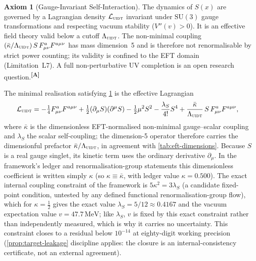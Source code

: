 \documentclass[12pt,a4paper,twoside]{article}
\theoremstyle{plain}
\theoremstyle{definition}
\newtheorem{axiom}{Axiom}
\theoremstyle{remark}
\newcommand{\UIDT}{\textsc{uidt}}
\newcommand{\MeV}{\,\mathrm{MeV}}
\newcommand{\catmark}[1]{\textsuperscript{\textsf{\textbf{[#1]}}}}
\newcommand{\Sx}{S(x)}
\newcommand{\lambdaS}{5/12 \approx 0.4167} %
\newcommand{\kappaVal}{0.500} %
\newcommand{\vVEV}{47.7\MeV} %
\begin{document}
\begin{axiom}[Gauge-Invariant Self-Interaction]
\label{ax:gauge}
The dynamics of $\Sx$ are governed by a Lagrangian density $\mathcal{L}_{\UIDT}$ invariant under $\mathrm{SU}(3)$ gauge transformations and respecting vacuum stability ($V''(v)>0$). It is an effective field theory valid below a cutoff $\Lambda_{\UIDT}$. The non-minimal coupling $(\bar\kappa/\Lambda_{\UIDT})\,S\,F_{\mu\nu}^a F^{a\mu\nu}$ has mass dimension~5 and is therefore not renormalisable by strict power counting; its validity is confined to the EFT domain (Limitation~L7). A full non-perturbative UV completion is an open research question.\catmark{A}
\end{axiom}

\noindent The minimal realisation satisfying \cref{ax:gauge} is the effective Lagrangian
\begin{equation}
 \mathcal{L}_{\UIDT}
 = -\tfrac{1}{4}F_{\mu\nu}^a F^{a\mu\nu}
 + \tfrac{1}{2}(\partial_\mu S)(\partial^\mu S)
 - \tfrac{1}{2}\mu^2 S^2
 - \frac{\lambda_S}{4!}S^4
 + \frac{\bar\kappa}{\Lambda_{\UIDT}}\,S\,F_{\mu\nu}^a F^{a\mu\nu},
 \label{eq:lagrangian}
\end{equation}
where $\bar\kappa$ is the dimensionless EFT-normalised non-minimal gauge--scalar coupling and $\lambda_S$ the scalar self-coupling; the dimension-5 operator therefore carries the dimensionful prefactor $\bar\kappa/\Lambda_{\UIDT}$, in agreement with \cref{tab:eft-dimensions}. Because $S$ is a real gauge singlet, its kinetic term uses the ordinary derivative $\partial_\mu$. In the framework's ledger and renormalisation-group statements this dimensionless coefficient is written simply $\kappa$ (so $\kappa\equiv\bar\kappa$, with ledger value $\kappa=\kappaVal$). The exact internal coupling constraint of the framework is $5\kappa^2 = 3\lambda_S$ (a candidate fixed-point condition, untested by any defined functional renormalisation-group flow), which for $\kappa = \tfrac{1}{2}$ gives the exact value $\lambda_S = \lambdaS$ and the vacuum expectation value $v = \vVEV$; like $\lambda_S$, $v$ is fixed by this exact constraint rather than independently measured, which is why it carries no uncertainty. This constraint closes to a residual below $10^{-14}$ at eighty-digit working precision (\cref{prop:target-leakage} discipline applies: the closure is an internal-consistency certificate, not an external agreement).
\end{document}
